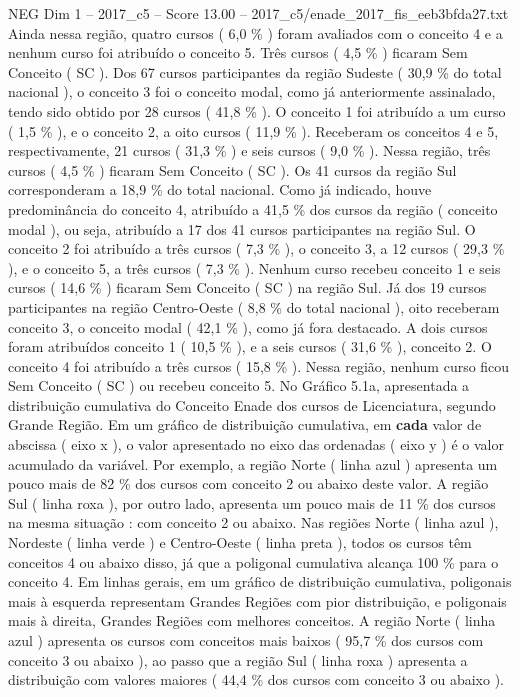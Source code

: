 \begin{textsample}{NEG Dim 1 – 2017\_c5 – Score 13.00 – 2017\_c5/enade\_2017\_fis\_eeb3bfda27.txt}
Ainda nessa região, quatro cursos ( 6,0 \% ) foram avaliados com o conceito 4 e a nenhum curso foi atribuído o conceito 5.
Três cursos ( 4,5 \% ) ficaram Sem Conceito ( SC ).
Dos 67 cursos participantes da região Sudeste ( 30,9 \% do total nacional ), o conceito 3 foi o conceito modal, como já anteriormente assinalado, tendo sido obtido por 28 cursos ( 41,8 \% ).
O conceito 1 foi atribuído a um curso ( 1,5 \% ), e o conceito 2, a oito cursos ( 11,9 \% ).
Receberam os conceitos 4 e 5, respectivamente, 21 cursos ( 31,3 \% ) e seis cursos ( 9,0 \% ).
Nessa região, três cursos ( 4,5 \% ) ficaram Sem Conceito ( SC ).
Os 41 cursos da região Sul corresponderam a 18,9 \% do total nacional.
Como já indicado, houve predominância do conceito 4, atribuído a 41,5 \% dos cursos da região ( conceito modal ), ou seja, atribuído a 17 dos 41 cursos participantes na região Sul.
O conceito 2 foi atribuído a três cursos ( 7,3 \% ), o conceito 3, a 12 cursos ( 29,3 \% ), e o conceito 5, a três cursos ( 7,3 \% ).
Nenhum curso recebeu conceito 1 e seis cursos ( 14,6 \% ) ficaram Sem Conceito ( SC ) na região Sul.
Já dos 19 cursos participantes na região Centro-Oeste ( 8,8 \% do total nacional ), oito receberam conceito 3, o conceito modal ( 42,1 \% ), como já fora destacado.
A dois cursos foram atribuídos conceito 1 ( 10,5 \% ), e a seis cursos ( 31,6 \% ), conceito 2.
O conceito 4 foi atribuído a três cursos ( 15,8 \% ).
Nessa região, nenhum curso ficou Sem Conceito ( SC ) ou recebeu conceito 5.
No Gráfico 5.1a, apresentada a distribuição cumulativa do Conceito Enade dos cursos de Licenciatura, segundo Grande Região.
Em um gráfico de distribuição cumulativa, em \textbf{cada} valor de abscissa ( eixo x ), o valor apresentado no eixo das ordenadas ( eixo y ) é o valor acumulado da variável.
Por exemplo, a região Norte ( linha azul ) apresenta um pouco mais de 82 \% dos cursos com conceito 2 ou abaixo deste valor.
A região Sul ( linha roxa ), por outro lado, apresenta um pouco mais de 11 \% dos cursos na mesma situação : com conceito 2 ou abaixo.
Nas regiões Norte ( linha azul ), Nordeste ( linha verde ) e Centro-Oeste ( linha preta ), todos os cursos têm conceitos 4 ou abaixo disso, já que a poligonal cumulativa alcança 100 \% para o conceito 4.
Em linhas gerais, em um gráfico de distribuição cumulativa, poligonais mais à esquerda representam Grandes Regiões com pior distribuição, e poligonais mais à direita, Grandes Regiões com melhores conceitos.
A região Norte ( linha azul ) apresenta os cursos com conceitos mais baixos ( 95,7 \% dos cursos com conceito 3 ou abaixo ), ao passo que a região Sul ( linha roxa ) apresenta a distribuição com valores maiores ( 44,4 \% dos cursos com conceito 3 ou abaixo ).

\end{textsample}
